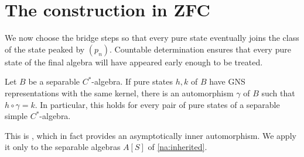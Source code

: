 \section{The construction in ZFC}
\label{sec:construction}

We now choose the bridge steps so that every pure state eventually
joins the class of the state peaked by $(p_n)$. Countable
determination ensures that every pure state of the final algebra
will have appeared early enough to be treated.

\begin{theorem}
\label{na:homogeneity}
Let $B$ be a separable $C^*$-algebra. If pure states $h,k$ of $B$
have GNS representations with the same kernel, there is an
automorphism $\gamma$ of $B$ such that $h\circ\gamma=k$.
In particular, this holds for every pair of pure states of a
separable simple $C^*$-algebra.
\end{theorem}

This is \cite[Theorem~1.1]{KishimotoOzawaSakai2003}, which in fact
provides an asymptotically inner automorphism. We apply it only to
the separable algebras $A[S]$ of \cref{na:inherited}.

